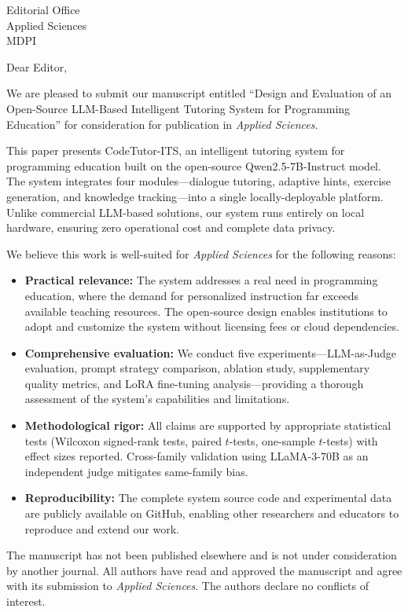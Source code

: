 \documentclass[11pt]{letter}
\begin{document}
\begin{letter}{Editorial Office\\Applied Sciences\\MDPI}

\opening{Dear Editor,}

We are pleased to submit our manuscript entitled ``Design and Evaluation of an Open-Source LLM-Based Intelligent Tutoring System for Programming Education'' for consideration for publication in \textit{Applied Sciences}.

This paper presents CodeTutor-ITS, an intelligent tutoring system for programming education built on the open-source Qwen2.5-7B-Instruct model. The system integrates four modules---dialogue tutoring, adaptive hints, exercise generation, and knowledge tracking---into a single locally-deployable platform. Unlike commercial LLM-based solutions, our system runs entirely on local hardware, ensuring zero operational cost and complete data privacy.

We believe this work is well-suited for \textit{Applied Sciences} for the following reasons:

\begin{itemize}
    \item \textbf{Practical relevance:} The system addresses a real need in programming education, where the demand for personalized instruction far exceeds available teaching resources. The open-source design enables institutions to adopt and customize the system without licensing fees or cloud dependencies.
    \item \textbf{Comprehensive evaluation:} We conduct five experiments---LLM-as-Judge evaluation, prompt strategy comparison, ablation study, supplementary quality metrics, and LoRA fine-tuning analysis---providing a thorough assessment of the system's capabilities and limitations.
    \item \textbf{Methodological rigor:} All claims are supported by appropriate statistical tests (Wilcoxon signed-rank tests, paired $t$-tests, one-sample $t$-tests) with effect sizes reported. Cross-family validation using LLaMA-3-70B as an independent judge mitigates same-family bias.
    \item \textbf{Reproducibility:} The complete system source code and experimental data are publicly available on GitHub, enabling other researchers and educators to reproduce and extend our work.
\end{itemize}

The manuscript has not been published elsewhere and is not under consideration by another journal. All authors have read and approved the manuscript and agree with its submission to \textit{Applied Sciences}. The authors declare no conflicts of interest.


\end{letter}
\end{document}
